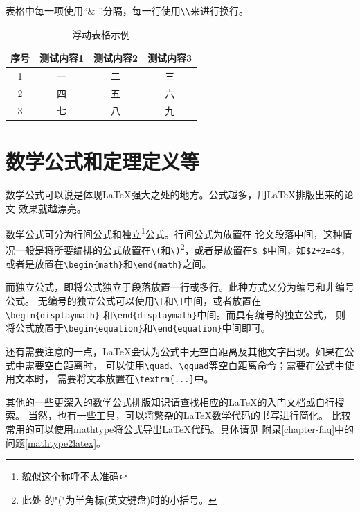 表格中每一项使用“\& ”分隔，每一行使用\texttt{\textbackslash\textbackslash}来进行换行。
\begin{table}
\begin{center}
\caption{浮动表格示例\label{tab-test3}}
\begin{tabular}{c||c|c|c}
\hline
序号&测试内容1&测试内容2&测试内容3\\
\hline \hline
1&一&二&三\\
\hline
2&四&五&六\\
\hline
3&七&八&九\\
\hline
\end{tabular}
\end{center}
\end{table}

\section{数学公式和定理定义等}
\label{sec-math}
数学公式可以说是体现\LaTeX{}强大之处的地方。公式越多，用\LaTeX{}排版出来的论文
效果就越漂亮。

数学公式可分为行间公式和独立\footnote{貌似这个称呼不太准确}公式。{\heiti 行间公式}为放置在
论文段落中间，这种情况一般是将所要编排的公式放置在\verb|\(|和\verb|\)|\footnote{此处
的"("为半角标(英文键盘)时的小括号。}，或者是放置在\verb|$ $|中间，如\verb|$2+2=4$|，
或者是放置在\verb|\begin{math}|和\verb|\end{math}|之间。

而独立公式，即将公式独立于段落放置一行或多行。此种方式又分为编号和非编号公式。
{\heiti 无编号}的独立公式可以使用\verb|\[|和\verb|\]|中间，或者放置在\verb|\begin{displaymath}|
和\verb|\end{displaymath}|中间。而{\heiti 具有编号}的独立公式，
则将公式放置于\verb|\begin{equation}|和\verb|\end{equation}|中间即可。

还有需要注意的一点，\LaTeX{}会认为公式中无空白距离及其他文字出现。如果在公式中需要空白距离时，
可以使用\verb|\quad|、\verb|\qquad|等空白距离命令；需要在公式中使用文本时，
需要将文本放置在\verb|\textrm{...}|中。

其他的一些更深入的数学公式排版知识请查找相应的\LaTeX{}的入门文档或自行搜索。
当然，也有一些工具，可以将繁杂的\LaTeX{}数学代码的书写进行简化。
比较常用的可以使用mathtype将公式导出\LaTeX{}代码。具体请见
附录\ref{chapter-faq}中的问题\ref{mathtype2latex}。

